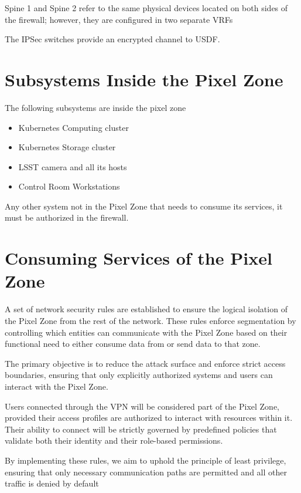 Spine 1 and Spine 2 refer to the same physical devices located on both sides of the firewall; however, they are configured in two separate VRFs

The IPSec switches provide an encrypted channel to USDF. 

\section{Subsystems Inside the Pixel Zone}

The following subsystems are inside the pixel zone

\begin{itemize}
    \item Kubernetes Computing cluster
    \item Kubernetes Storage cluster
    \item LSST camera and all its hosts
    \item Control Room Workstations
\end{itemize}

Any other system not in the Pixel Zone that needs to consume its services, it must be authorized in the firewall. 

\section{Consuming Services of the Pixel Zone}

A set of network security rules are  established to ensure the logical isolation of the Pixel Zone from the rest of the network. These rules enforce segmentation by controlling which entities can communicate with the Pixel Zone based on their functional need to either consume data from or send data to that zone.

The primary objective is to reduce the attack surface and enforce strict access boundaries, ensuring that only explicitly authorized systems and users can interact with the Pixel Zone.

Users connected through the VPN will be considered part of the Pixel Zone, provided their access profiles are authorized to interact with resources within it. Their ability to connect will be strictly governed by predefined policies that validate both their identity and their role-based permissions.

By implementing these rules, we aim to uphold the principle of least privilege, ensuring that only necessary communication paths are permitted and all other traffic is denied by default

